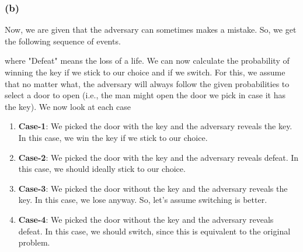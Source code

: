 \documentclass[12pt]{article}
\begin{document}
    \subsubsection*{(b)}
    Now, we are given that the adversary can sometimes makes a mistake. So, we get the following
    sequence of events.
    \begin{center}
    \end{center}
    where "Defeat" means the loss of a life. We can now calculate the probability of winning
    the key if we stick to our choice and if we switch. For this, we assume that no matter what,
    the adversary will always follow the given probabilities to select a door to open (i.e., the
    man might open the door we pick in case it has the key).
    We now look at each case
    \begin{enumerate}
        \item \textbf{Case-1}: We picked the door with the key and the adversary reveals the key. In
        this case, we win the key if we stick to our choice.
        \item \textbf{Case-2}: We picked the door with the key and the adversary reveals defeat. In this
        case, we should ideally stick to our choice.
        \item \textbf{Case-3}: We picked the door without the key and the adversary reveals the key. In this
        case, we lose anyway. So, let's assume switching is better.
        \item \textbf{Case-4}: We picked the door without the key and the adversary reveals defeat. In this
        case, we should switch, since this is equivalent to the original problem.
    \end{enumerate}
\end{document}
